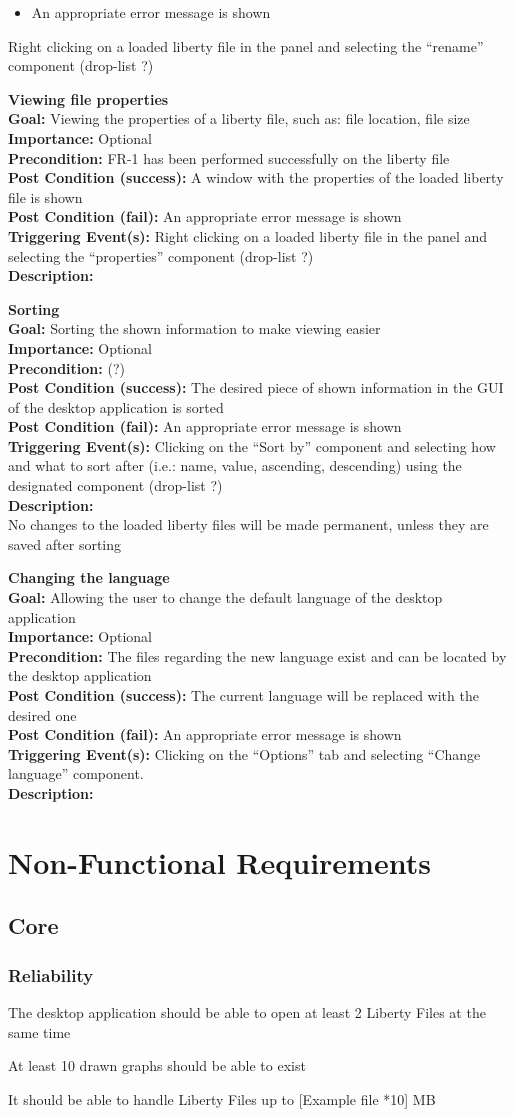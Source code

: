 \documentclass[10pt,a4paper]{report}
\newcommand{\FRODescription}[8]{
    \textbf{#1} \\
    \textbf{Goal: } #2 \\
    \textbf{Importance: } #3 \\
    \textbf{Precondition: } #4 \\
    \textbf{Post Condition (success): } #5 \\
    \textbf{Post Condition (fail): } #6 \\
    \textbf{Triggering Event(s): } #7 \\
    \textbf{Description: } \\ 
    #8}
\begin{document}
\begin{FRO}
{\begin{itemize}
        \item An appropriate error message is shown
    \end{itemize}}
    {Right clicking on a loaded liberty file in the panel and selecting the “rename” component (drop-list ?)}
    \item \FRODescription{Viewing file properties}
    {Viewing the properties of a liberty file, such as: file location, file size}
    {Optional}
    {FR-1 has been performed successfully on the liberty file}
    {A window with the properties of the loaded liberty file is shown}
    {An appropriate error message is shown}
    {Right clicking on a loaded liberty file in the panel and selecting the “properties” component (drop-list ?)}
    \item \FRODescription{Sorting}
    {Sorting the shown information to make viewing easier}
    {Optional}
    {(?)}
    {The desired piece of shown information in the GUI of the desktop application is sorted}
    {An appropriate error message is shown}
    {Clicking on the “Sort by” component and selecting how and what to sort after (i.e.: name, value, ascending, descending) using the designated component (drop-list ?)}
    {No changes to the loaded liberty files will be made permanent, unless they are saved after sorting}
    \item \FRODescription{Changing the language}
    {Allowing the user to change the default language of the desktop application}
    {Optional}
    {The files regarding the new language exist and can be located by the desktop application}
    {The current language will be replaced with the desired one}
    {An appropriate error message is shown}
    {Clicking on the “Options” tab and selecting “Change language” component.}
\end{FRO}

\section{Non-Functional Requirements}
\subsection{Core}
\subsubsection{Reliability}
\begin{NFR-Rel}
    \item The desktop application should be able to open at least 2 Liberty Files at the same time
    \item At least 10 drawn graphs should be able to exist
    \item It should be able to handle Liberty Files up to [Example file *10] MB
\end{NFR-Rel}
\end{document}
